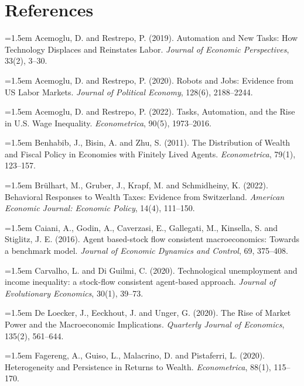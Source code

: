 \documentclass[12pt]{article}
\begin{document}
\section*{References}
\small
\begingroup\setlength{\parindent}{0pt}
\hangindent=1.5em Acemoglu, D. and Restrepo, P. (2019). Automation and New Tasks: How Technology Displaces and Reinstates Labor. \textit{Journal of Economic Perspectives}, 33(2), 3--30.\par\addvspace{0.45em}
\hangindent=1.5em Acemoglu, D. and Restrepo, P. (2020). Robots and Jobs: Evidence from US Labor Markets. \textit{Journal of Political Economy}, 128(6), 2188--2244.\par\addvspace{0.45em}
\hangindent=1.5em Acemoglu, D. and Restrepo, P. (2022). Tasks, Automation, and the Rise in U.S. Wage Inequality. \textit{Econometrica}, 90(5), 1973--2016.\par\addvspace{0.45em}
\hangindent=1.5em Benhabib, J., Bisin, A. and Zhu, S. (2011). The Distribution of Wealth and Fiscal Policy in Economies with Finitely Lived Agents. \textit{Econometrica}, 79(1), 123--157.\par\addvspace{0.45em}
\hangindent=1.5em Brülhart, M., Gruber, J., Krapf, M. and Schmidheiny, K. (2022). Behavioral Responses to Wealth Taxes: Evidence from Switzerland. \textit{American Economic Journal: Economic Policy}, 14(4), 111--150.\par\addvspace{0.45em}
\hangindent=1.5em Caiani, A., Godin, A., Caverzasi, E., Gallegati, M., Kinsella, S. and Stiglitz, J. E. (2016). Agent based-stock flow consistent macroeconomics: Towards a benchmark model. \textit{Journal of Economic Dynamics and Control}, 69, 375--408.\par\addvspace{0.45em}
\hangindent=1.5em Carvalho, L. and Di Guilmi, C. (2020). Technological unemployment and income inequality: a stock-flow consistent agent-based approach. \textit{Journal of Evolutionary Economics}, 30(1), 39--73.\par\addvspace{0.45em}
\hangindent=1.5em De Loecker, J., Eeckhout, J. and Unger, G. (2020). The Rise of Market Power and the Macroeconomic Implications. \textit{Quarterly Journal of Economics}, 135(2), 561--644.\par\addvspace{0.45em}
\hangindent=1.5em Fagereng, A., Guiso, L., Malacrino, D. and Pistaferri, L. (2020). Heterogeneity and Persistence in Returns to Wealth. \textit{Econometrica}, 88(1), 115--170.\par\addvspace{0.45em}
\end{document}
